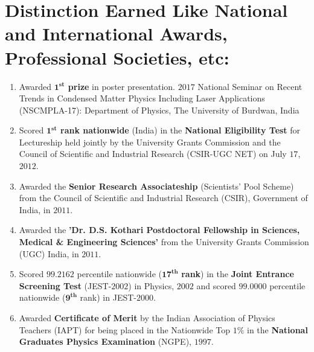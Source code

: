 \documentclass[a4paper,11pt,color]{article}
\begin{document}
\section{Distinction Earned Like National and International Awards, Professional Societies, etc:}
\begin{enumerate}[label=(\roman*)] 
\item
Awarded \textbf{$\bm{1^{st}}$ prize} in poster presentation.
$2017$ National Seminar on Recent Trends in Condensed Matter Physics Including Laser Applications
(NSCMPLA-17): Department of Physics, The University of Burdwan, India
\item
Scored \textbf{$\bm{1^{st}}$ rank nationwide} (India) in the \textbf{National Eligibility Test} for Lectureship held jointly by the University Grants Commission and the Council of Scientific and Industrial Research (CSIR-UGC NET) on July $17$, $2012$.
\item
Awarded the \textbf{Senior Research Associateship} (Scientists' Pool Scheme) from the Council of Scientific and Industrial Research (CSIR), Government of India, in $2011$.
\item
Awarded the \textbf{'Dr. D.S. Kothari Postdoctoral Fellowship in Sciences, Medical \& Engineering Sciences'} from the University Grants Commission (UGC) India, in $2011$.
\item
Scored $99.2162$ percentile nationwide ($\bm{17^{th}}$ \textbf{rank}) in the \textbf{Joint Entrance Screening Test} (JEST-$2002$) in Physics, $2002$ and scored $99.0000$ percentile nationwide ($\bm{9^{th}}$ rank) in JEST-$2000$.
\item Awarded \textbf{Certificate of Merit} by the Indian Association of Physics Teachers (IAPT) for being placed in the Nationwide Top $1\%$ in the \textbf{National Graduates Physics Examination} (NGPE), $1997$.
\end{enumerate}
\end{document}
